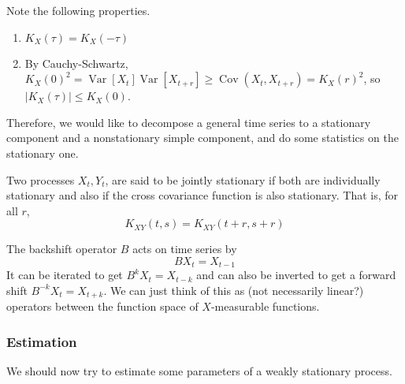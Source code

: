 \documentclass{article}
\DeclareMathOperator{\Cov}{Cov}
\DeclareMathOperator{\Var}{Var}
\begin{document}
  \begin{theorem}
    Note the following properties. 
    \begin{enumerate}
      \item $K_X (\tau) = K_X (- \tau)$ 
      \item By Cauchy-Schwartz, $K_X (0)^2 = \Var[X_t] \Var[X_{t+r}] \geq \Cov(X_t, X_{t+r}) = K_X (r)^2$, so $|K_X (\tau)| \leq K_X (0)$. 
    \end{enumerate}
  \end{theorem}

  Therefore, we would like to decompose a general time series to a stationary component and a nonstationary simple component, and do some statistics on the stationary one. 

  \begin{definition}
    Two processes $X_t, Y_t$, are said to be jointly stationary if both are individually stationary and also if the cross covariance function is also stationary. That is, for all $r$, 
    \begin{equation}
      K_{XY} (t, s) = K_{XY}(t + r, s + r)
    \end{equation}
  \end{definition}

  \begin{definition}
    The backshift operator $B$ acts on time series by 
    \begin{equation}
      B X_t = X_{t-1}
    \end{equation}
    It can be iterated to get $B^k X_t = X_{t-k}$ and can also be inverted to get a forward shift $B^{-k} X_t  = X_{t+k}$. We can just think of this as (not necessarily linear?) operators between the function space of $X$-measurable functions. 
  \end{definition}

  \subsubsection{Estimation}

    We should now try to estimate some parameters of a weakly stationary process. 
\end{document}
